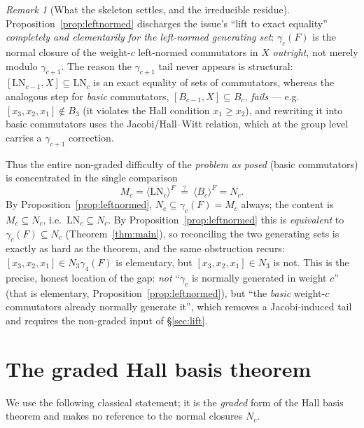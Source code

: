 \documentclass{amsart}
\theoremstyle{definition}
\theoremstyle{remark}
\newtheorem{remark}{Remark}
\begin{document}
\begin{remark}[What the skeleton settles, and the irreducible residue]\label{rem:skeleton}
Proposition~\ref{prop:leftnormed} discharges the issue's ``lift to exact equality''
\emph{completely and elementarily for the left-normed generating set}: $\gamma_c(F)$ is
the normal closure of the weight-$c$ left-normed commutators in $X$ \emph{outright},
not merely modulo $\gamma_{c+1}$. The reason the $\gamma_{c+1}$ tail never appears is
structural: $[\mathrm{LN}_{c-1},X]\subseteq\mathrm{LN}_c$ is an exact equality of sets
of commutators, whereas the analogous step for \emph{basic} commutators,
$[B_{c-1},X]\subseteq B_c$, \emph{fails} --- e.g.\ $[x_3,x_2,x_1]\notin B_3$ (it
violates the Hall condition $x_1\ge x_2$), and rewriting it into basic commutators uses
the Jacobi/Hall--Witt relation, which at the group level carries a $\gamma_{c+1}$
correction.

Thus the entire non-graded difficulty of the \emph{problem as posed} (basic
commutators) is concentrated in the single comparison
\begin{equation}\label{eq:reconcile}
M_c=\langle\mathrm{LN}_c\rangle^{F}\ \overset{?}{=}\ \langle B_c\rangle^{F}=N_c .
\end{equation}
By Proposition~\ref{prop:leftnormed}, $N_c\subseteq\gamma_c(F)=M_c$ always; the content
is $M_c\subseteq N_c$, i.e.\ $\mathrm{LN}_c\subseteq N_c$. By
Proposition~\ref{prop:leftnormed} this is \emph{equivalent} to $\gamma_c(F)\subseteq
N_c$ (Theorem~\ref{thm:main}), so reconciling the two generating sets is exactly as hard
as the theorem, and the same obstruction recurs: $[x_3,x_2,x_1]\in
N_3\gamma_4(F)$ is elementary, but $[x_3,x_2,x_1]\in N_3$ is not. This is the precise,
honest location of the gap: \emph{not} ``$\gamma_c$ is normally generated in weight
$c$'' (that is elementary, Proposition~\ref{prop:leftnormed}), but ``the \emph{basic}
weight-$c$ commutators already normally generate it'', which removes a Jacobi-induced
tail and requires the non-graded input of \S\ref{sec:lift}.
\end{remark}

\section{The graded Hall basis theorem}\label{sec:input}

We use the following classical statement; it is the \emph{graded} form of the Hall
basis theorem and makes no reference to the normal closures $N_c$.
\end{document}
